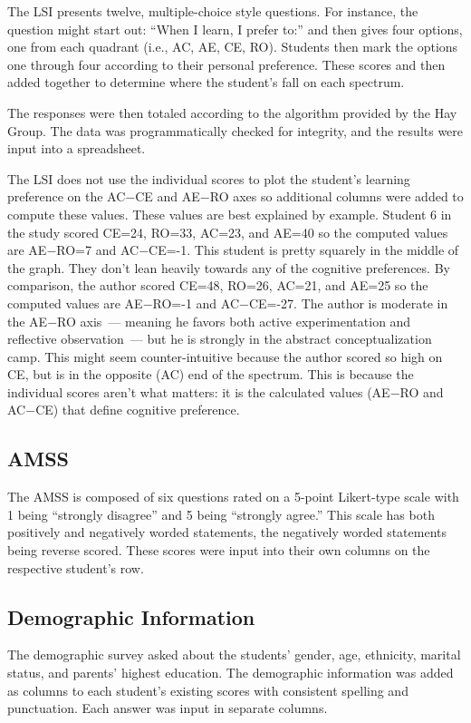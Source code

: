 The LSI presents twelve, multiple-choice style questions. For instance, the question might start out: ``When I learn, I prefer to:'' and then gives four options, one from each quadrant (i.e., AC, AE, CE, RO). Students then mark the options one through four according to their personal preference. These scores and then added together to determine where the student's fall on each spectrum.

The responses were then totaled according to the algorithm provided by the Hay Group. The data was programmatically checked for integrity, and the results were input into a spreadsheet.

The LSI does not use the individual scores to plot the student's learning preference on the AC$-$CE and AE$-$RO axes so additional columns were added to compute these values. These values are best explained by example. Student 6 in the study scored CE=24, RO=33, AC=23, and AE=40 so the computed values are AE$-$RO=7 and AC$-$CE=-1. This student is pretty squarely in the middle of the graph. They don't lean heavily towards any of the cognitive preferences. By comparison, the author scored CE=48, RO=26, AC=21, and AE=25 so the computed values are AE$-$RO=-1 and AC$-$CE=-27. The author is moderate in the AE$-$RO axis~--- meaning he favors both active experimentation and reflective observation~--- but he is strongly in the abstract conceptualization camp. This might seem counter-intuitive because the author scored so high on CE, but is in the opposite (AC) end of the spectrum. This is because the individual scores aren't what matters: it is the calculated values (AE$-$RO and AC$-$CE) that define cognitive preference.

\subsection{AMSS}
The AMSS is composed of six questions rated on a 5-point Likert-type scale with 1 being ``strongly disagree'' and 5 being ``strongly agree.'' This scale has both positively and negatively worded statements, the negatively worded statements being reverse scored. These scores were input into their own columns on the respective student's row.

\subsection{Demographic Information}
The demographic survey asked about the students' gender, age, ethnicity, marital status, and parents' highest education. The demographic information was added as columns to each student's existing scores with consistent spelling and punctuation. Each answer was input in separate columns.

